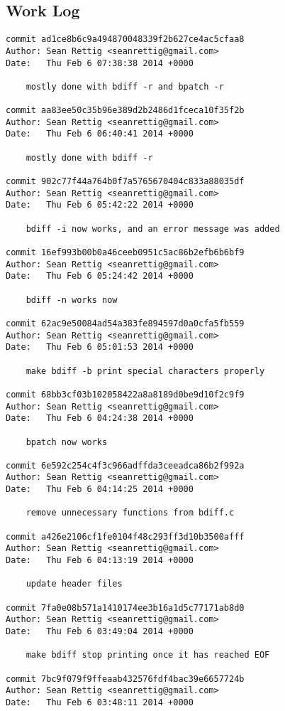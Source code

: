 \documentclass[letterpaper,10pt,fleqn]{article}
\numberwithin{equation}{section}
\begin{document}
\subsection*{Work Log}
\begin{verbatim}
commit ad1ce8b6c9a494870048339f2b627ce4ac5cfaa8
Author: Sean Rettig <seanrettig@gmail.com>
Date:   Thu Feb 6 07:38:38 2014 +0000

    mostly done with bdiff -r and bpatch -r

commit aa83ee50c35b96e389d2b2486d1fceca10f35f2b
Author: Sean Rettig <seanrettig@gmail.com>
Date:   Thu Feb 6 06:40:41 2014 +0000

    mostly done with bdiff -r

commit 902c77f44a764b0f7a5765670404c833a88035df
Author: Sean Rettig <seanrettig@gmail.com>
Date:   Thu Feb 6 05:42:22 2014 +0000

    bdiff -i now works, and an error message was added

commit 16ef993b00b0a46ceeb0951c5ac86b2efb6b6bf9
Author: Sean Rettig <seanrettig@gmail.com>
Date:   Thu Feb 6 05:24:42 2014 +0000

    bdiff -n works now

commit 62ac9e50084ad54a383fe894597d0a0cfa5fb559
Author: Sean Rettig <seanrettig@gmail.com>
Date:   Thu Feb 6 05:01:53 2014 +0000

    make bdiff -b print special characters properly

commit 68bb3cf03b102058422a8a8189d0be9d10f2c9f9
Author: Sean Rettig <seanrettig@gmail.com>
Date:   Thu Feb 6 04:24:38 2014 +0000

    bpatch now works

commit 6e592c254c4f3c966adffda3ceeadca86b2f992a
Author: Sean Rettig <seanrettig@gmail.com>
Date:   Thu Feb 6 04:14:25 2014 +0000

    remove unnecessary functions from bdiff.c

commit a426e2106cf1fe0104f48c293ff3d10b3500afff
Author: Sean Rettig <seanrettig@gmail.com>
Date:   Thu Feb 6 04:13:19 2014 +0000

    update header files

commit 7fa0e08b571a1410174ee3b16a1d5c77171ab8d0
Author: Sean Rettig <seanrettig@gmail.com>
Date:   Thu Feb 6 03:49:04 2014 +0000

    make bdiff stop printing once it has reached EOF

commit 7bc9f079f9ffeaab432576fdf4bac39e6657724b
Author: Sean Rettig <seanrettig@gmail.com>
Date:   Thu Feb 6 03:48:11 2014 +0000


\end{verbatim}
\end{document}
